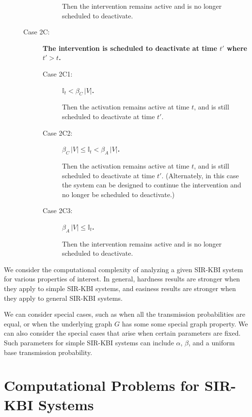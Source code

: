 \documentclass[11pt]{article}
\newcommand{\istate}{\mbox{$\mathbb{I}$}}
\begin{document}
\begin{description}
\begin{description}
\begin{description}
Then the intervention remains active and is no longer scheduled to deactivate.
\end{description}
\item
[Case 2C:]
{\bf The intervention is scheduled to deactivate at time $t'$ where $t' > t$.}
\begin{description}
\item
[Case 2C1:] 
{\bf $\istate_t < \beta_C \, |V|$.}

Then the activation remains active at time $t$,
and is still scheduled to deactivate at time $t'$.
\item
[Case 2C2:] 
{\bf $\beta_C \, |V| \leq \istate_t < \beta_A \, |V|$.}

Then the activation remains active at time $t$,
and is still scheduled to deactivate at time $t'$.
(Alternately, in this case the system can be designed 
to continue the intervention and no longer be scheduled to deactivate.)
\item
[Case 2C3:] 
{\bf $\beta_A \, |V| \leq \istate_t$.}

Then the intervention remains active and is no longer scheduled to deactivate.
\end{description}


\end{description}

\end{description}



\bigskip

We consider the computational complexity of analyzing a given SIR-KBI system 
for various properties of interest.
In general, hardness results are stronger when they apply to simple SIR-KBI systems,
and easiness results are stronger when they apply to general SIR-KBI systems.

We can consider special cases, such as when all the transmission probabilities are equal,
or when the underlying graph $G$ has some some special graph property.
We can also consider the special cases that arise when certain parameters are fixed.
Such parameters for simple  SIR-KBI systems 
can include $\alpha$, $\beta$, and a uniform base transmission probability.






\section{Computational Problems for SIR-KBI Systems}
\label{sec:computational_problems}
\end{document}

